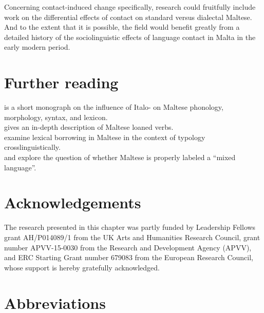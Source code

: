 \documentclass[output=paper]{langsci/langscibook}
\begin{document}
Concerning contact-induced change specifically,  research could fruitfully include  work on the differential effects of contact on standard versus dialectal Maltese. And to the extent that it is possible, the field would benefit greatly from a detailed history of the sociolinguistic effects of language contact in Malta in the early modern period.

\section*{Further reading}
\cite{krier1976} is a short monograph on the influence of Italo- on Maltese phonology, morphology, syntax, and lexicon. \\
\cite{mifsudloanverbs} gives an in-depth description of Maltese loaned verbs. \\
\cite{comriespagnol2016} examine lexical borrowing in Maltese in the context of  typology crosslinguistically. \\
\cite{Drewes1994} and \cite{stolz2003} explore the question of whether Maltese is properly labeled a ``mixed language''.

\section*{Acknowledgements}
The research presented in this chapter was partly funded by Leadership Fellows grant AH/P014089/1 from the UK Arts and Humanities Research Council, grant number APVV-15-0030 from the  Research and Development Agency (APVV), and ERC Starting Grant number 679083 from the European Research Council, whose support is hereby gratefully acknowledged.

\section*{Abbreviations}
\end{document}

